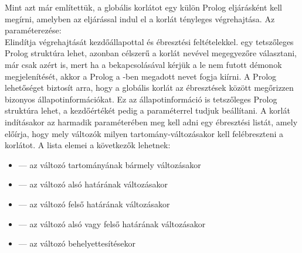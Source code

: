 Mint azt már említettük, a globális korlátot egy külön Prolog eljárásként
kell megírni, amelyben az  eljárással indul el a korlát
tényleges végrehajtása. Az  paraméterezése:
\br
{}\\
Elindítja  végrehajtását  kezdőállapottal és
 ébresztési feltételekkel.  egy tetszőleges Prolog
struktúra lehet, azonban célszerű a korlát nevével megegyezőre választani,
már csak azért is, mert ha a  bekapcsolásával kérjük
a le nem futott démonok megjelenítését, akkor a Prolog a -ben
megadott nevet fogja kiírni.
\br
A Prolog lehetőséget biztosít arra, hogy a globális korlát az ébresztések
között megőrizzen bizonyos állapotinformációkat. Ez az állapotinformáció
is tetszőleges Prolog struktúra lehet, a kezdőértékét pedig a 
paraméterrel tudjuk beállítani.
\br
A korlát indításakor az  harmadik paraméterében
meg kell adni egy ébresztési listát, amely előírja, hogy mely változók
milyen tartomány-változásakor kell felébreszteni a korlátot. A lista elemei
a következők lehetnek:
\begin{itemize}
\item {} --- az  változó tartományának bármely
változásakor
\item {} --- az  változó alsó határának változásakor
\item {} --- az  változó felső határának változásakor
\item {} --- az  változó alsó vagy felső határának
változásakor
\item {} --- az  változó behelyettesítésekor
\end{itemize}

